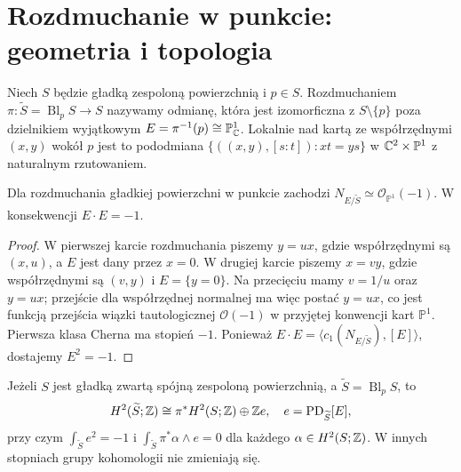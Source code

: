 \section{Rozdmuchanie w punkcie: geometria i topologia}
\begin{definicja}
Niech $S$ będzie gładką zespoloną powierzchnią i $p\in S$.
Rozdmuchaniem $\pi:\widetilde S=\operatorname{Bl}_pS\to S$
nazywamy odmianę, która jest izomorficzna z $S\setminus\{p\}$
poza dzielnikiem wyjątkowym $E=\pi^{-1}(p)\cong\mathbb P^1_{\mathbb{C}}$.
Lokalnie nad kartą ze współrzędnymi $(x,y)$ wokół $p$ jest to
pododmiana $\{((x,y),[s:t]):xt=ys\}$ w
$\mathbb{C}^2\times\mathbb P^1$ z naturalnym rzutowaniem.
\end{definicja}
\begin{lemat}
\label{lem:xvii-exceptional}
Dla rozdmuchania gładkiej powierzchni w punkcie zachodzi
$N_{E/\widetilde S}\simeq\mathcal O_{\mathbb P^1}(-1)$.
W konsekwencji $E\cdot E=-1$.
\end{lemat}
\begin{proof}
W pierwszej karcie rozdmuchania piszemy $y=ux$,
gdzie współrzędnymi są $(x,u)$, a $E$ jest dany przez $x=0$.
W drugiej karcie piszemy $x=vy$, gdzie współrzędnymi są
$(v,y)$ i $E=\{y=0\}$. Na przecięciu mamy $v=1/u$
oraz $y=ux$; przejście dla współrzędnej normalnej
ma więc postać $y=ux$, co jest funkcją przejścia
wiązki tautologicznej $\mathcal O(-1)$ w przyjętej konwencji
kart $\mathbb P^1$. Pierwsza klasa Cherna ma stopień $-1$.
Ponieważ $E\cdot E=\langle c_1(N_{E/\widetilde S}),[E]\rangle$,
dostajemy $E^2=-1$.
\end{proof}
\begin{twierdzenie}
\label{thm:xvii-blowup}
Jeżeli $S$ jest gładką zwartą spójną zespoloną powierzchnią,
a $\widetilde S=\operatorname{Bl}_pS$, to
\[
H^2(\widetilde S;\mathbb{Z})\cong \pi^*H^2(S;\mathbb{Z})\oplus\mathbb{Z} e,
\quad e=\operatorname{PD}_{\widetilde S}[E],
\]
przy czym $\int_{\widetilde S}e^2=-1$ i
$\int_{\widetilde S}\pi^*\alpha\wedge e=0$
dla każdego $\alpha\in H^2(S;\mathbb{Z})$.
W innych stopniach grupy kohomologii nie zmieniają się.
\end{twierdzenie}
